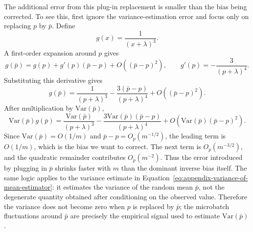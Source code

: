 \documentclass{article}
\newcommand{\Var}{\mathrm{Var}}
\begin{document}
The additional error from this plug-in replacement is smaller than the bias being corrected. To see this, first ignore the variance-estimation error and focus only on replacing $p$ by $\bar p$. Define
\begin{equation}
    g(x) = \frac{1}{(x+\lambda)^3}.
\end{equation}
A first-order expansion around $p$ gives
\begin{equation}
    g(\bar p)
    =
    g(p)
    +
    g'(p)(\bar p-p)
    +
    O((\bar p-p)^2),
    \qquad
    g'(p) = -\frac{3}{(p+\lambda)^4}.
\end{equation}
Substituting this derivative gives
\begin{equation}
    g(\bar p)
    =
    \frac{1}{(p+\lambda)^3}
    -
    \frac{3(\bar p-p)}{(p+\lambda)^4}
    +
    O((\bar p-p)^2).
\end{equation}
After multiplication by $\Var(\bar p)$,
\begin{equation}
    \Var(\bar p)g(\bar p)
    =
    \frac{\Var(\bar p)}{(p+\lambda)^3}
    -
    \frac{3\Var(\bar p)(\bar p-p)}{(p+\lambda)^4}
    +
    O(\Var(\bar p)(\bar p-p)^2).
\end{equation}
Since $\Var(\bar p)=O(1/m)$ and $\bar p-p=O_p(m^{-1/2})$, the leading term is $O(1/m)$, which is the bias we want to correct. The next term is $O_p(m^{-3/2})$, and the quadratic remainder contributes $O_p(m^{-2})$. Thus the error introduced by plugging in $\bar p$ shrinks faster with $m$ than the dominant inverse bias itself. The same logic applies to the variance estimate in Equation~\eqref{eq:appendix-variance-of-mean-estimator}: it estimates the variance of the random mean $\bar p$, not the degenerate quantity obtained after conditioning on the observed value. Therefore the variance does not become zero when $p$ is replaced by $\bar p$; the microbatch fluctuations around $\bar p$ are precisely the empirical signal used to estimate $\Var(\bar p)$.
\end{document}
